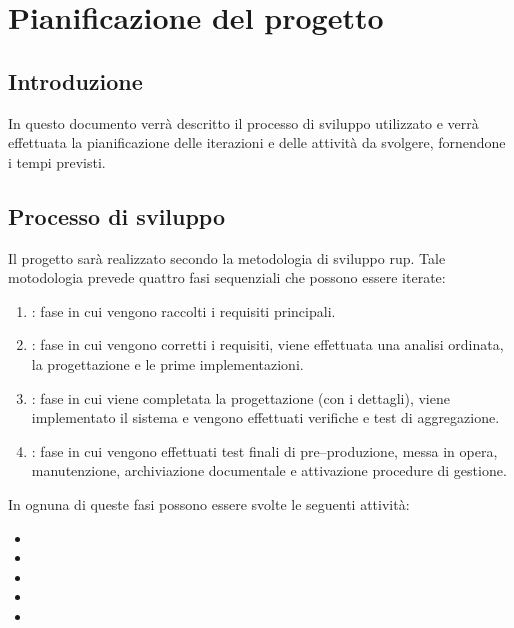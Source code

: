 \chapter{Pianificazione del progetto} 
\label{cha:pianificazione_del_progetto}	

\section{Introduzione}
\label{sec:introduzione}
In questo documento verrà descritto il processo di sviluppo utilizzato e verrà effettuata la pianificazione delle iterazioni e delle attività da svolgere, fornendone i tempi previsti. %

\section{Processo di sviluppo}
\label{sec:processo_di_sviluppo}
Il progetto sarà realizzato secondo la metodologia di sviluppo \gls{rup}.
Tale motodologia prevede quattro fasi sequenziali che possono essere iterate:
\begin{enumerate}
	\item {}: fase in cui vengono raccolti i requisiti principali.

	\item {}: fase in cui vengono corretti i requisiti, viene effettuata una analisi ordinata, la progettazione e le prime implementazioni.

	\item {}: fase in cui viene completata la progettazione (con i dettagli), viene implementato il sistema e vengono effettuati verifiche e test di aggregazione.

	\item {}: fase in cui vengono effettuati test finali di pre--produzione, messa in opera, manutenzione, archiviazione documentale e attivazione procedure di gestione.
\end{enumerate}

\noindent
In ognuna di queste fasi possono essere svolte le seguenti attività:
\begin{itemize}
	\item {}
	\item {}
	\item {}
	\item {}
	\item {}
\end{itemize}

